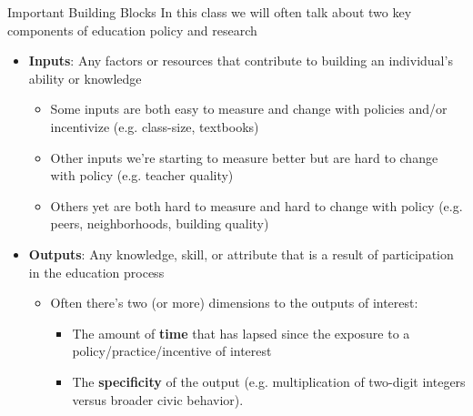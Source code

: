 \documentclass{beamer}
\begin{document}
\begin{frame}{Important Building Blocks}
    In this class we will often talk about two key components of education policy and research    
    \begin{itemize}
        \item \textbf{Inputs}: Any factors or resources that contribute to building an individual's ability or knowledge
        \begin{itemize}
            \item Some inputs are both easy to measure and change with policies and/or incentivize (e.g. class-size, textbooks)
            \item Other inputs we're starting to measure better but are hard to change with policy (e.g. teacher quality)
            \item Others yet are both hard to measure and hard to change with policy (e.g. peers, neighborhoods, building quality)
        \end{itemize}
        \item \textbf{Outputs}: Any knowledge, skill, or attribute that is a result of participation in the education process
        	\begin{itemize}
		\item Often there's two (or more) dimensions to the outputs of interest:
      	  	\begin{itemize}
        	  		 \item The amount of \textbf{time} that has lapsed since the exposure to a policy/practice/incentive of interest
        	   	 	\item The \textbf{specificity} of the output (e.g. multiplication of two-digit integers versus broader civic behavior).
        		\end{itemize}
	\end{itemize}	
    \end{itemize}
\end{frame}    
\end{document}
